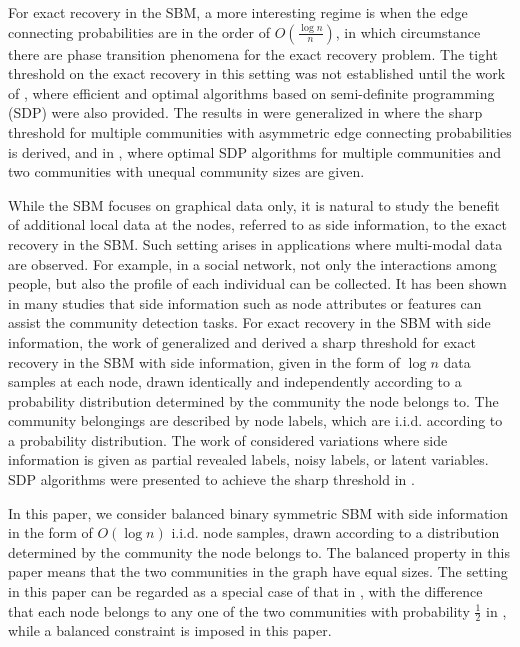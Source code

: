 \documentclass[conference]{IEEEtran}
\begin{document}
	For exact recovery in the SBM, a more interesting regime is when the edge connecting probabilities are in the order of $O(\frac{\log n}{n})$, in which circumstance there are phase transition phenomena for the exact recovery problem. 
	The tight threshold on the exact recovery in this setting was not established until the work of \cite{abbe2015exact,mossel2016}, where efficient and optimal algorithms based on semi-definite programming (SDP) were also provided. 
	The results in \cite{abbe2015exact,mossel2016} were generalized in \cite{abbe2015community} where the sharp threshold for multiple communities with asymmetric edge connecting probabilities is derived, and in \cite{Hajek16}, where optimal SDP algorithms for multiple communities and two communities with unequal community sizes are given.
	
	While the SBM focuses on graphical data only, it is natural to study the benefit of additional local data at the nodes, referred to as side information, to the exact recovery in the SBM. Such setting arises in applications where multi-modal data are observed. For example, in a social network, not only the interactions among people, but also the profile of each individual can be collected. It has been shown in many studies that side information such as node attributes or features \cite{zhang2016community,mossel2016local,saad2020recovering} can assist the community detection tasks. For exact recovery in the SBM with side information, the work of \cite{abbe17sideinfo} generalized \cite{abbe2015community} and derived a sharp threshold for exact recovery in the SBM with side information, given in the form of $\log n$ data samples at each node, drawn identically and independently  according to a probability distribution determined by the community the node belongs to. The community belongings are described by node labels, which are i.i.d. according to a probability distribution. 
	The work of \cite{esmaeili2019exact,esmaeili2019community,saad2018community,esmaeili2019b,esmaeili2020a} considered variations where side information is given as partial revealed labels, noisy labels, or latent variables. SDP algorithms were presented to achieve the sharp threshold in \cite{esmaeili2019exact,esmaeili2019b,esmaeili2020a}.
	
	In this paper, we consider balanced binary symmetric SBM with side information in the form of $O(\log n)$ i.i.d. node samples, drawn according to a distribution determined by the community the node belongs to. The balanced property in this paper means that the two communities in the graph have equal sizes. The setting in this paper can be regarded as a special case of that in \cite{abbe17sideinfo}, with the difference that each node belongs to any one of the two communities with probability $\frac{1}{2}$ in \cite{Abbe17}, while a balanced constraint is imposed in this paper.  
	
\end{document}
